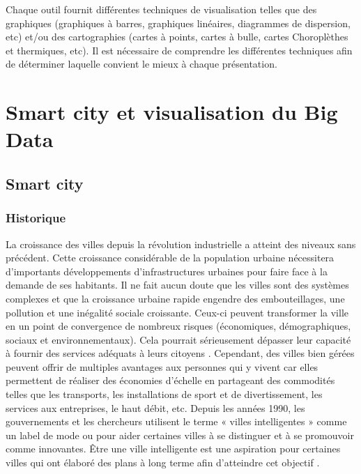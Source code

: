 \documentclass[french, a4paper, 12pt]{report}
\begin{document}
Chaque outil fournit différentes techniques de visualisation telles que des graphiques (graphiques à barres, graphiques linéaires, diagrammes de dispersion, etc) et/ou des cartographies (cartes à points, cartes à bulle, cartes Choroplèthes et thermiques, etc).  Il est nécessaire de comprendre les différentes techniques afin de déterminer laquelle convient le mieux à chaque présentation.

\chapter{Smart city  et  visualisation du Big Data}
\section{Smart city}
\subsection{Historique}
La croissance des villes depuis la révolution industrielle a atteint des niveaux sans précédent. 
Cette croissance considérable de la population urbaine nécessitera d’importants développements d’infrastructures urbaines pour faire face à la demande de ses habitants. Il ne fait aucun doute que les villes sont des systèmes complexes et que la croissance urbaine rapide engendre des embouteillages, une pollution et une inégalité sociale croissante. Ceux-ci peuvent transformer la ville en un point de convergence de nombreux risques (économiques, démographiques, sociaux et environnementaux). Cela pourrait sérieusement dépasser leur capacité à fournir des services adéquats à leurs citoyens \cite{1}. Cependant, des villes bien gérées peuvent offrir de multiples avantages aux personnes qui y vivent car elles permettent de réaliser des économies d’échelle en partageant des commodités telles que les transports, les installations de sport et de divertissement, les services aux entreprises, le haut débit, etc.
Depuis les années 1990, les gouvernements et les chercheurs utilisent le terme « villes intelligentes » comme un label de mode ou pour aider certaines villes à se distinguer et à se promouvoir comme innovantes. Être une ville intelligente est une aspiration pour certaines villes qui ont élaboré des plans à long terme afin d’atteindre cet objectif \cite{2}.
\end{document}
